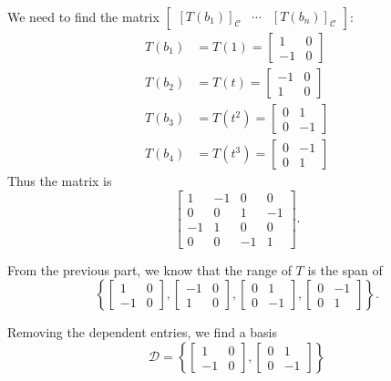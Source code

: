 \documentclass[12pt,letterpaper]{article}
\begin{document}
\begin{enumerate}
							We need to find the matrix
					$\left[ \begin{array}{ccc} [T(b_1)]_{\mathcal{C}} & \cdots & [T(b_n)]_{\mathcal{C}} \end{array} \right]$:				\begin{align*}
					T(b_1) &= T(1) = \begin{bmatrix} 1 & 0 \\ -1 & 0 \end{bmatrix} \\
					T(b_2) &= T(t) = \begin{bmatrix} -1 & 0 \\ 1 & 0 \end{bmatrix} \\
					T(b_3) &= T(t^2) = \begin{bmatrix} 0 & 1 \\ 0 & -1 \end{bmatrix} \\
					T(b_4) &= T(t^3) = \begin{bmatrix} 0 & -1 \\ 0 & 1 \end{bmatrix}
				\end{align*}
				Thus the matrix is
				\[
					\begin{bmatrix} 1 & -1 & 0 & 0 \\ 0 & 0 & 1 & -1 \\ -1 & 1 & 0 & 0 \\ 0 & 0 & -1 & 1 \end{bmatrix}.
				\]
				
		From the previous part, we know that the range of $T$ is the span of 
				\[
					\left\{ \begin{bmatrix} 1 & 0 \\ -1 & 0 \end{bmatrix}, \begin{bmatrix} -1 & 0 \\ 1 & 0 \end{bmatrix}, \begin{bmatrix} 0 & 1 \\ 0 & -1 \end{bmatrix}, \begin{bmatrix} 0 & -1 \\ 0 & 1 \end{bmatrix} \right\}.
				\]

				Removing the dependent entries, we find a basis
				\[
					\mathcal{D} = \left\{ \begin{bmatrix} 1 & 0 \\ -1 & 0 \end{bmatrix}, \begin{bmatrix} 0 & 1 \\ 0 & -1 \end{bmatrix} \right\}
				\]
					

\end{enumerate}
\end{document}
